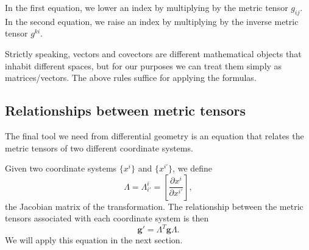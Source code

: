 In the first equation, we lower an index by multiplying by the metric tensor
\(g_{ij}\). In the second equation, we raise an index
by multiplying by the inverse metric tensor \(g^{ki}\).

Strictly speaking, vectors and covectors are different mathematical objects
that inhabit different spaces, but for our purposes we can treat them simply as
matrices/vectors. The above rules suffice for applying the formulas.

\subsection{Relationships between metric tensors}
The final tool we need from differential geometry is an equation that relates
the metric tensors of two different coordinate systems.

Given two coordinate systems \(\{x^i\}\) and \(\{x^{i'}\}\), we define
\[
	\Lambda=\Lambda^i_{i'}=\left[\frac{\partial x^i}{\partial
	x^{i'}}\right],
\]
the Jacobian matrix of the transformation. The relationship between the metric tensors associated with each coordinate
system is then
\begin{equation}
	\boldsymbol{g'}=\Lambda^T \boldsymbol{g} \Lambda.\label{tensorrelations}
\end{equation}
We will apply this equation in the next section.
